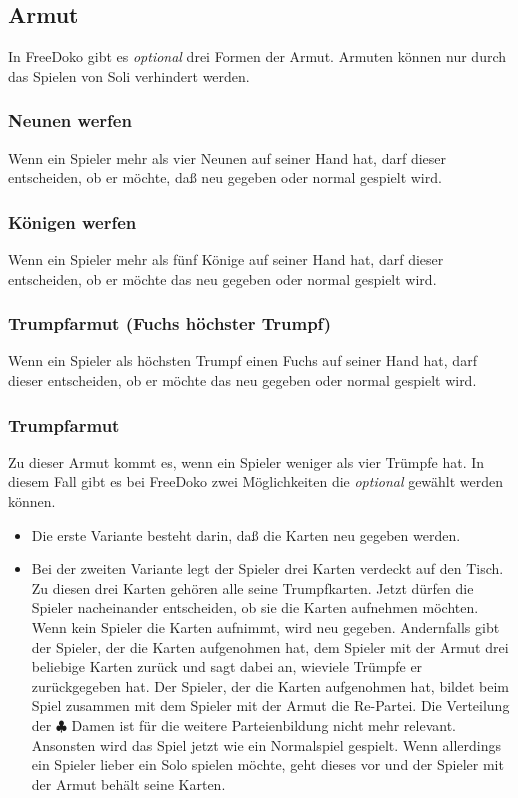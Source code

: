 \documentclass{scrartcl}
\newcommand{\kreuz}{$\clubsuit$\xspace}
\newcommand{\optional}{\textit{optional}\xspace}
\begin{document}
\subsection{Armut}
In FreeDoko gibt es \optional drei Formen der Armut.  Armuten können nur durch das Spielen von Soli verhindert werden.

\subsubsection{Neunen werfen}
Wenn ein Spieler mehr als vier Neunen auf seiner Hand hat, darf dieser entscheiden, ob er möchte, daß neu gegeben oder normal gespielt wird.

\subsubsection{Königen werfen}
Wenn ein Spieler mehr als fünf Könige auf seiner Hand hat, darf dieser entscheiden, ob er möchte das neu gegeben oder normal gespielt wird.

\subsubsection{Trumpfarmut (Fuchs höchster Trumpf)}
Wenn ein Spieler als höchsten Trumpf einen Fuchs auf seiner Hand hat, darf dieser entscheiden, ob er möchte das neu gegeben oder normal gespielt wird.

\subsubsection{Trumpfarmut}
Zu dieser Armut kommt es, wenn ein Spieler weniger als vier Trümpfe hat. In diesem Fall gibt es bei FreeDoko zwei Möglichkeiten die \optional gewählt werden können.
\begin{itemize}
  \item
    Die erste Variante besteht darin, daß die Karten neu gegeben werden.
  \item
    Bei der zweiten Variante legt der Spieler drei Karten verdeckt
    auf den Tisch. Zu diesen drei Karten gehören alle seine
    Trumpfkarten. Jetzt dürfen die Spieler nacheinander entscheiden,
    ob sie die Karten aufnehmen möchten. Wenn kein Spieler die
    Karten aufnimmt, wird neu gegeben. Andernfalls gibt der Spieler,
    der die Karten aufgenohmen hat, dem Spieler mit der Armut drei
    beliebige Karten zurück und sagt dabei an, wieviele Trümpfe er
    zurückgegeben hat. Der Spieler, der die Karten aufgenohmen hat,
    bildet beim Spiel zusammen mit dem Spieler mit der Armut die
    Re-Partei. Die Verteilung der \kreuz Damen ist für die weitere
    Parteienbildung nicht mehr relevant. Ansonsten wird das Spiel
    jetzt wie ein Normalspiel gespielt. Wenn allerdings ein Spieler
    lieber ein Solo spielen möchte, geht dieses vor und der Spieler
    mit der Armut behält seine Karten.
\end{itemize}
\end{document}

